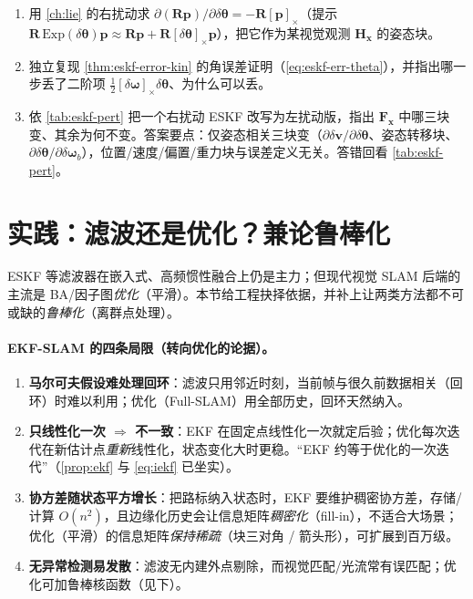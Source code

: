 \begin{practice}
\begin{enumerate}
  \item 用 \cref{ch:lie} 的右扰动求 $\partial(\mathbf{R}\mathbf{p})/\partial\delta\boldsymbol{\theta}=-\mathbf{R}[\mathbf{p}]_\times$（提示 $\mathbf{R}\,\mathrm{Exp}(\delta\boldsymbol{\theta})\mathbf{p}\approx\mathbf{R}\mathbf{p}+\mathbf{R}[\delta\boldsymbol{\theta}]_\times\mathbf{p}$），把它作为某视觉观测 $\mathbf{H}_{\mathbf{x}}$ 的姿态块。
  \item 独立复现 \cref{thm:eskf-error-kin} 的角误差证明（\cref{eq:eskf-err-theta}），并指出哪一步丢了二阶项 $\tfrac12[\delta\boldsymbol{\omega}]_\times\delta\boldsymbol{\theta}$、为什么可以丢。
  \item 依 \cref{tab:eskf-pert} 把一个右扰动 ESKF 改写为左扰动版，指出 $\mathbf{F}_{\mathbf{x}}$ 中哪三块变、其余为何不变。答案要点：仅姿态相关三块变（$\partial\delta\mathbf{v}/\partial\delta\boldsymbol{\theta}$、姿态转移块、$\partial\delta\boldsymbol{\theta}/\partial\delta\boldsymbol{\omega}_b$），位置/速度/偏置/重力块与误差定义无关。答错回看 \cref{tab:eskf-pert}。
\end{enumerate}
\end{practice}

\section{实践：滤波还是优化？兼论鲁棒化}
\label{sec:filter-vs-opt}

ESKF 等滤波器在嵌入式、高频惯性融合上仍是主力；但现代视觉 SLAM 后端的主流是 BA/因子图\emph{优化}（平滑）。本节给工程抉择依据，并补上让两类方法都不可或缺的\emph{鲁棒化}（离群点处理）。

\paragraph{EKF-SLAM 的四条局限（转向优化的论据）。}\cite{gaoxiang2019slam14}
\begin{enumerate}
  \item \textbf{马尔可夫假设难处理回环}：滤波只用邻近时刻，当前帧与很久前数据相关（回环）时难以利用；优化（Full-SLAM）用全部历史，回环天然纳入。
  \item \textbf{只线性化一次 $\Rightarrow$ 不一致}：EKF 在固定点线性化一次就定后验；优化每次迭代在新估计点\emph{重新}线性化，状态变化大时更稳。“EKF 约等于优化的一次迭代”（\cref{prop:ekf} 与 \cref{eq:iekf} 已坐实）。
  \item \textbf{协方差随状态平方增长}：把路标纳入状态时，EKF 要维护稠密协方差，存储/计算 $O(n^2)$，且边缘化历史会让信息矩阵\emph{稠密化}（fill-in），不适合大场景；优化（平滑）的信息矩阵\emph{保持稀疏}（块三对角 / 箭头形），可扩展到百万级\cite{carlone2026handbook}。
  \item \textbf{无异常检测易发散}：滤波无内建外点剔除，而视觉匹配/光流常有误匹配；优化可加鲁棒核函数（见下）。
\end{enumerate}


